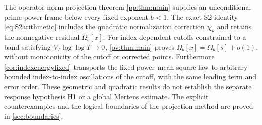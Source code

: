 \documentclass[11pt,reqno]{amsart}
\numberwithin{equation}{section}
\begin{document}
The operator-norm projection theorem \cref{pp:thm:main} supplies an
unconditional prime-power frame below every fixed exponent $b<1$.
The exact S2 identity \eqref{eq:S2arithmetic} includes the quadratic
normalization correction $\chi_k$ and retains the nonnegative residual
$\Omega_b[x]$. For index-dependent cutoffs constrained to a band satisfying
$V_T\log\log T\to0$, \cref{ov:thm:main} proves
$\Omega_b[x]=\Omega_b[s]+o(1)$, without monotonicity of the cutoff
or corrected points. Furthermore \cref{cor:indexenergyfixed} transports
the fixed-power mean-square law to arbitrary bounded index-to-index
oscillations of the cutoff, with the same leading term and error order.
These geometric and quadratic results do not establish the separate
response hypothesis H1 or a global Mertens estimate. The explicit counterexamples
and the logical boundaries of the projection method are proved in
\cref{sec:boundaries}.
\end{document}
